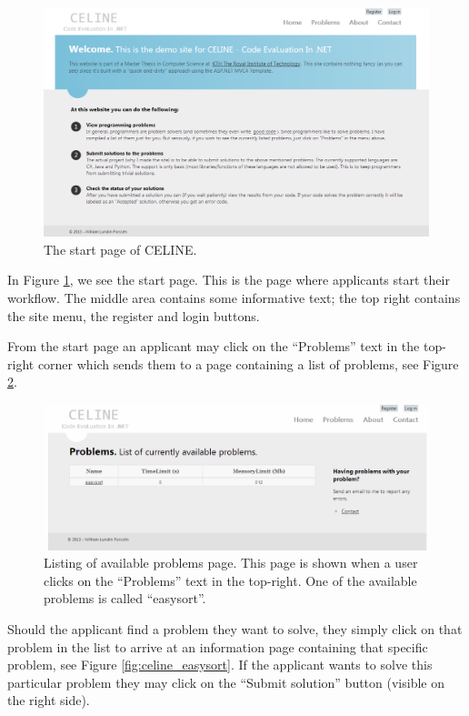 \begin{figure}[h]
	\centering
	\includegraphics[width=1.0\textwidth]{chapters/media/celine_startpage.png}
	\caption{The start page of CELINE.}
	\label{fig:celine_startpage}
\end{figure}

In Figure \ref{fig:celine_startpage}, we see the start page. This is the page where applicants start their workflow. The middle area contains some informative text; the top right contains the site menu, the register and login buttons.

From the start page an applicant may click on the ``Problems'' text in the top-right corner which sends them to a page containing a list of problems, see Figure \ref{fig:celine_list_problems}.

\begin{figure}[h]
	\centering
	\includegraphics[width=1.0\textwidth]{chapters/media/celine_listproblemsCut.png}
	\caption{Listing of available problems page. This page is shown when a user clicks on the ``Problems'' text in the top-right. One of the available problems is called ``easysort''. }
	\label{fig:celine_list_problems}
\end{figure}

Should the applicant find a problem they want to solve, they simply click on that problem in the list to arrive at an information page containing that specific problem, see Figure \ref{fig:celine_easysort}. If the applicant wants to solve this particular problem they may click on the ``Submit solution'' button (visible on the right side).

